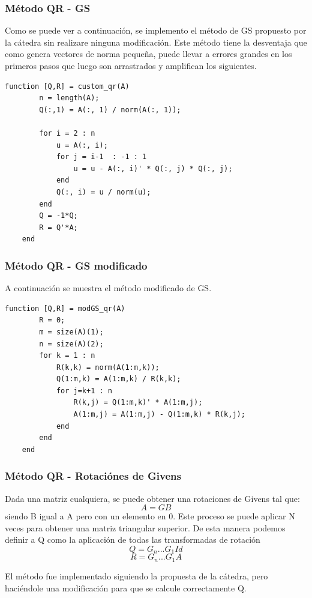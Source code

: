 \documentclass[a4paper,10pt,spanish]{article}
\begin{document}
\subsubsection{Método QR - GS}
Como se puede ver a continuación, se implemento el método de GS propuesto por la cátedra sin realizare ninguna modificación. Este método tiene la desventaja que como genera vectores de norma pequeña, puede llevar a errores grandes en los primeros pasos que luego son arrastrados y amplifican los siguientes.

\begin{lstlisting}[caption = Implementación de la descomposición QR con GS]
	function [Q,R] = custom_qr(A)
		n = length(A);
		Q(:,1) = A(:, 1) / norm(A(:, 1));

		for i = 2 : n
			u = A(:, i);
			for j = i-1  : -1 : 1
				u = u - A(:, i)' * Q(:, j) * Q(:, j);
			end
			Q(:, i) = u / norm(u);
		end
		Q = -1*Q;
		R = Q'*A;
	end
\end{lstlisting}
\subsubsection{Método QR - GS modificado}

A continuación se muestra el método modificado de GS.

\begin{lstlisting}[caption = Implementación de la descomposición QR con GS]
	function [Q,R] = modGS_qr(A)
		R = 0;
		m = size(A)(1);
		n = size(A)(2);
		for k = 1 : n
			R(k,k) = norm(A(1:m,k));
			Q(1:m,k) = A(1:m,k) / R(k,k);
			for j=k+1 : n
				R(k,j) = Q(1:m,k)' * A(1:m,j);
				A(1:m,j) = A(1:m,j) - Q(1:m,k) * R(k,j);
			end
		end
	end
\end{lstlisting}
\subsubsection{Método QR - Rotaciónes de Givens}

Dada una matriz cualquiera, se puede obtener una rotaciones de Givens tal que: \[  A=G B  \] siendo B igual a A pero con un elemento en 0. Este proceso se puede aplicar N veces para obtener una matriz triangular superior.
De esta manera podemos definir a Q como la aplicación de todas las transformadas de rotación \[ Q = G_n ... G_1  Id  \] \[ R = G_n ... G_1  A  \]

El método fue implementado siguiendo la propuesta de la cátedra, pero haciéndole una modificación para que se calcule correctamente Q.
\end{document}
